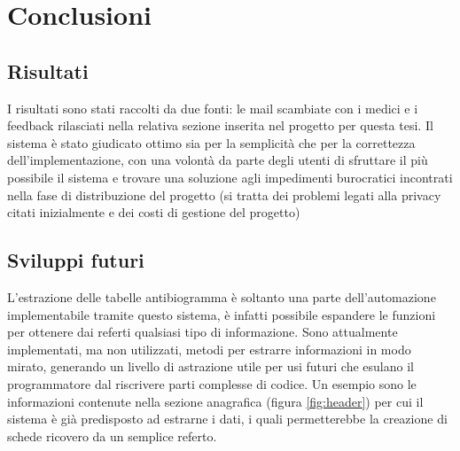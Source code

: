\chapter{Conclusioni}
\section{Risultati}
I risultati sono stati raccolti da due fonti: le mail scambiate con i medici e i feedback rilasciati nella relativa sezione inserita nel progetto per questa tesi.
Il sistema è stato giudicato ottimo sia per la semplicità che per la correttezza dell'implementazione, con una volontà da parte degli utenti di sfruttare il più possibile il sistema e trovare una soluzione agli impedimenti burocratici incontrati nella fase di distribuzione del progetto (si tratta dei problemi legati alla privacy citati inizialmente e dei costi di gestione del progetto)
\section{Sviluppi futuri}
L'estrazione delle tabelle antibiogramma è soltanto una parte dell'automazione implementabile tramite questo sistema, è infatti possibile espandere le funzioni per ottenere dai referti qualsiasi tipo di informazione. 
Sono attualmente implementati, ma non utilizzati, metodi per estrarre informazioni in modo mirato, generando un livello di astrazione utile per usi futuri che esulano il programmatore dal riscrivere parti complesse di codice.
Un esempio sono le informazioni contenute nella sezione anagrafica (figura \ref{fig:header}) per cui il sistema è già predisposto ad estrarne i dati, i quali permetterebbe la creazione di schede ricovero da un semplice referto.

